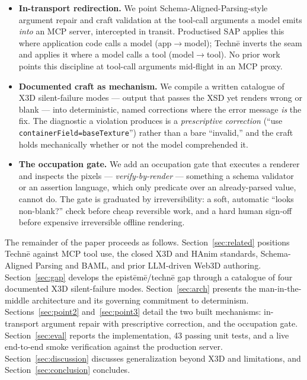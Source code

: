 \documentclass[sigconf,nonacm,screen,anonymous]{acmart}
\begin{document}
\begin{itemize}
  \item \textbf{In-transport redirection.} We point Schema-Aligned-Parsing-style argument repair and craft validation at the tool-call arguments a model emits \emph{into} an MCP server, intercepted in transit. Productised SAP applies this where application code calls a model (app$\rightarrow$model); Technē inverts the seam and applies it where a model calls a tool (model$\rightarrow$tool). No prior work points this discipline at tool-call arguments mid-flight in an MCP proxy.
  \item \textbf{Documented craft as mechanism.} We compile a written catalogue of X3D silent-failure modes --- output that passes the XSD yet renders wrong or blank --- into deterministic, named corrections where the error message \emph{is} the fix. The diagnostic a violation produces is a \emph{prescriptive correction} (``use \texttt{containerField=\textquotesingle{}baseTexture\textquotesingle{}}'') rather than a bare ``invalid,'' and the craft holds mechanically whether or not the model comprehended it.
  \item \textbf{The occupation gate.} We add an occupation gate that executes a renderer and inspects the pixels --- \emph{verify-by-render} --- something a schema validator or an assertion language, which only predicate over an already-parsed value, cannot do. The gate is graduated by irreversibility: a soft, automatic ``looks non-blank?'' check before cheap reversible work, and a hard human sign-off before expensive irreversible offline rendering.
\end{itemize}

The remainder of the paper proceeds as follows. Section~\ref{sec:related} positions Technē against MCP tool use, the closed X3D and HAnim standards, Schema-Aligned Parsing and BAML, and prior LLM-driven Web3D authoring. Section~\ref{sec:gap} develops the epistēmē/technē gap through a catalogue of four documented X3D silent-failure modes. Section~\ref{sec:arch} presents the man-in-the-middle architecture and its governing commitment to determinism. Sections~\ref{sec:point2} and~\ref{sec:point3} detail the two built mechanisms: in-transport argument repair with prescriptive correction, and the occupation gate. Section~\ref{sec:eval} reports the implementation, 43 passing unit tests, and a live end-to-end smoke verification against the production server. Section~\ref{sec:discussion} discusses generalization beyond X3D and limitations, and Section~\ref{sec:conclusion} concludes.
\end{document}
